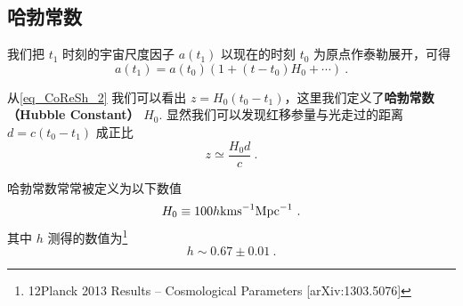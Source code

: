 \subsection{哈勃常数}
我们把 $t_1$ 时刻的宇宙尺度因子 $a(t_1)$ 以现在的时刻 $t_0$ 为原点作泰勒展开，可得
\begin{equation}
a(t_1)=a(t_0)(1+(t-t_0)H_0+\cdots)~.
\end{equation}

从\autoref{eq_CoReSh_2} 我们可以看出 $z=H_0(t_0-t_1)$，这里我们定义了\textbf{哈勃常数（Hubble Constant）} $H_0$. 显然我们可以发现红移参量与光走过的距离 $d=c(t_0-t_1)$ 成正比
\begin{equation}
z\simeq\frac{H_0d}{c}~.
\end{equation}

哈勃常数常常被定义为以下数值
\begin{equation}
H_0 \equiv100 h {\rm kms}^{-1}{\rm Mpc}^{-1}~.
\end{equation}
其中 $h$ 测得的数值为\footnote{12Planck 2013 Results – Cosmological Parameters [arXiv:1303.5076]}
\begin{equation}
h\sim 0.67 \pm 0.01~.
\end{equation}
